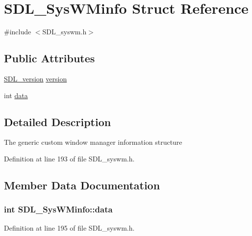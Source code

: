 \hypertarget{struct_s_d_l___sys_w_minfo}{}\section{S\+D\+L\+\_\+\+Sys\+W\+Minfo Struct Reference}
\label{struct_s_d_l___sys_w_minfo}


{\ttfamily \#include $<$S\+D\+L\+\_\+syswm.\+h$>$}

\subsection*{Public Attributes}
\begin{DoxyCompactItemize}
\item 
\hyperlink{struct_s_d_l__version}{S\+D\+L\+\_\+version} \hyperlink{struct_s_d_l___sys_w_minfo_ac3a70af022d4849e9ff546595e94627f}{version}
\item 
int \hyperlink{struct_s_d_l___sys_w_minfo_ac69151baa9187a402f9f9e4ce9ed7c8a}{data}
\end{DoxyCompactItemize}


\subsection{Detailed Description}
The generic custom window manager information structure 

Definition at line 193 of file S\+D\+L\+\_\+syswm.\+h.



\subsection{Member Data Documentation}
\hypertarget{struct_s_d_l___sys_w_minfo_ac69151baa9187a402f9f9e4ce9ed7c8a}{}
\subsubsection[{data}]{\setlength{\rightskip}{0pt plus 5cm}int S\+D\+L\+\_\+\+Sys\+W\+Minfo\+::data}\label{struct_s_d_l___sys_w_minfo_ac69151baa9187a402f9f9e4ce9ed7c8a}


Definition at line 195 of file S\+D\+L\+\_\+syswm.\+h.

\hypertarget{struct_s_d_l___sys_w_minfo_ac3a70af022d4849e9ff546595e94627f}{}
